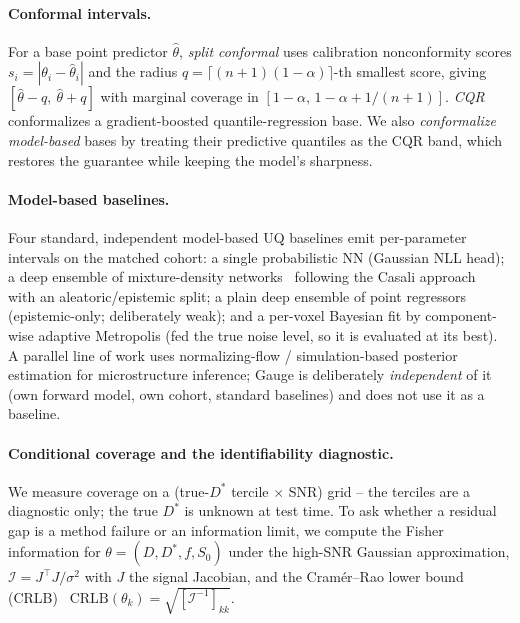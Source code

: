 \documentclass[11pt]{article}
\newcommand{\Dstar}{D^{*}}
\begin{document}
\paragraph{Conformal intervals.}
For a base point predictor $\hat\theta$, \emph{split conformal} uses calibration
nonconformity scores $s_i = |\theta_i - \hat\theta_i|$ and the radius
$q=\lceil(n{+}1)(1-\alpha)\rceil$-th smallest score, giving
$[\hat\theta - q,\ \hat\theta + q]$ with marginal coverage in
$[1-\alpha,\,1-\alpha+1/(n{+}1)]$. \emph{CQR}~\citep{romano2019} conformalizes a
gradient-boosted quantile-regression base. We also \emph{conformalize model-based}
bases by treating their predictive quantiles as the CQR band, which restores the
guarantee while keeping the model's sharpness.

\paragraph{Model-based baselines.}
Four standard, independent model-based UQ baselines emit per-parameter intervals on
the matched cohort: a single probabilistic NN (Gaussian NLL head); a deep ensemble
of mixture-density networks~\citep{bishop1994,lakshminarayanan2017} following the
Casali approach~\citep{casali2026} with an aleatoric/epistemic split; a plain deep
ensemble of point regressors (epistemic-only; deliberately weak); and a per-voxel
Bayesian fit by component-wise adaptive Metropolis (fed the true noise level, so it
is evaluated at its best). A parallel line of work uses normalizing-flow /
simulation-based posterior estimation for microstructure inference; Gauge is
deliberately \emph{independent} of it (own forward model, own cohort, standard
baselines) and does not use it as a baseline.

\paragraph{Conditional coverage and the identifiability diagnostic.}
We measure coverage on a (true-$\Dstar$ tercile $\times$ SNR) grid -- the terciles
are a diagnostic only; the true $\Dstar$ is unknown at test time. To ask whether a
residual gap is a method failure or an information limit, we compute the Fisher
information for $\theta=(D,\Dstar,f,S_0)$ under the high-SNR Gaussian approximation,
$\mathcal{I}=J^\top J/\sigma^2$ with $J$ the signal Jacobian, and the
Cram\'er--Rao lower bound (CRLB)~\citep{cramer1946}
$\mathrm{CRLB}(\theta_k)=\sqrt{[\mathcal{I}^{-1}]_{kk}}$.
\end{document}
